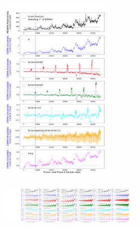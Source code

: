 \documentclass[twoside,11pt]{article}
\begin{document}
\begin{figure}[!htbp]
\centering
\begin{subfigure}[t]{0.4\linewidth}
     \centering
     \begin{subfigure}[t]{\linewidth}
     \centering
         \includegraphics[width=0.8\textwidth, trim=.0in .0in .0in .0in, clip]{../figures/v14/bike_sharing/reg_lin_cat_syr_10_tr_3/neg_single_bike_fisher_mlines_with_regu_1e-08_0_0001_0_01_99_99.png}
     \end{subfigure}
     \begin{subfigure}[t]{\linewidth}
     \centering
         \includegraphics[width=\textwidth, trim=12.5in 0.5in 3.0in 1.0in, clip]{../figures/v14/bike_sharing/reg_lin_cat_syr_10_tr_3/neg_single_bike_fisher_mlines_with_regu_1e-08_0_0001_0_01_99_99_72.png}

\end{subfigure}
\end{subfigure}
\end{figure}
\end{document}
